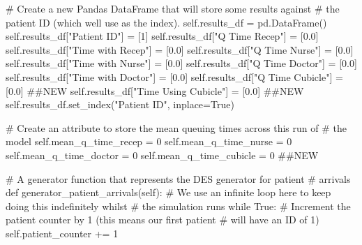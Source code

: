\documentclass[
  letterpaper,
  DIV=11,
  numbers=noendperiod]{scrreprt}
\newenvironment{Shaded}{}{}
\newcommand{\CommentTok}[1]{\textcolor[rgb]{0.42,0.45,0.49}{#1}}
\newcommand{\ControlFlowTok}[1]{\textcolor[rgb]{0.84,0.23,0.29}{#1}}
\newcommand{\DecValTok}[1]{\textcolor[rgb]{0.00,0.36,0.77}{#1}}
\newcommand{\FloatTok}[1]{\textcolor[rgb]{0.00,0.36,0.77}{#1}}
\newcommand{\KeywordTok}[1]{\textcolor[rgb]{0.84,0.23,0.29}{#1}}
\newcommand{\NormalTok}[1]{\textcolor[rgb]{0.14,0.16,0.18}{#1}}
\newcommand{\OperatorTok}[1]{\textcolor[rgb]{0.14,0.16,0.18}{#1}}
\newcommand{\StringTok}[1]{\textcolor[rgb]{0.01,0.18,0.38}{#1}}
\newcommand{\VariableTok}[1]{\textcolor[rgb]{0.89,0.38,0.04}{#1}}
\begin{document}
\begin{tcolorbox}
\begin{Shaded}
\begin{Highlighting}[]
        \CommentTok{\# Create a new Pandas DataFrame that will store some results against}
        \CommentTok{\# the patient ID (which we\textquotesingle{}ll use as the index).}
        \VariableTok{self}\NormalTok{.results\_df }\OperatorTok{=}\NormalTok{ pd.DataFrame()}
        \VariableTok{self}\NormalTok{.results\_df[}\StringTok{"Patient ID"}\NormalTok{] }\OperatorTok{=}\NormalTok{ [}\DecValTok{1}\NormalTok{]}
        \VariableTok{self}\NormalTok{.results\_df[}\StringTok{"Q Time Recep"}\NormalTok{] }\OperatorTok{=}\NormalTok{ [}\FloatTok{0.0}\NormalTok{]}
        \VariableTok{self}\NormalTok{.results\_df[}\StringTok{"Time with Recep"}\NormalTok{] }\OperatorTok{=}\NormalTok{ [}\FloatTok{0.0}\NormalTok{]}
        \VariableTok{self}\NormalTok{.results\_df[}\StringTok{"Q Time Nurse"}\NormalTok{] }\OperatorTok{=}\NormalTok{ [}\FloatTok{0.0}\NormalTok{]}
        \VariableTok{self}\NormalTok{.results\_df[}\StringTok{"Time with Nurse"}\NormalTok{] }\OperatorTok{=}\NormalTok{ [}\FloatTok{0.0}\NormalTok{]}
        \VariableTok{self}\NormalTok{.results\_df[}\StringTok{"Q Time Doctor"}\NormalTok{] }\OperatorTok{=}\NormalTok{ [}\FloatTok{0.0}\NormalTok{]}
        \VariableTok{self}\NormalTok{.results\_df[}\StringTok{"Time with Doctor"}\NormalTok{] }\OperatorTok{=}\NormalTok{ [}\FloatTok{0.0}\NormalTok{]}
        \VariableTok{self}\NormalTok{.results\_df[}\StringTok{"Q Time Cubicle"}\NormalTok{] }\OperatorTok{=}\NormalTok{ [}\FloatTok{0.0}\NormalTok{] }\CommentTok{\#\#NEW}
        \VariableTok{self}\NormalTok{.results\_df[}\StringTok{"Time Using Cubicle"}\NormalTok{] }\OperatorTok{=}\NormalTok{ [}\FloatTok{0.0}\NormalTok{] }\CommentTok{\#\#NEW}
        \VariableTok{self}\NormalTok{.results\_df.set\_index(}\StringTok{"Patient ID"}\NormalTok{, inplace}\OperatorTok{=}\VariableTok{True}\NormalTok{)}

        \CommentTok{\# Create an attribute to store the mean queuing times across this run of}
        \CommentTok{\# the model}
        \VariableTok{self}\NormalTok{.mean\_q\_time\_recep }\OperatorTok{=} \DecValTok{0}
        \VariableTok{self}\NormalTok{.mean\_q\_time\_nurse }\OperatorTok{=} \DecValTok{0}
        \VariableTok{self}\NormalTok{.mean\_q\_time\_doctor }\OperatorTok{=} \DecValTok{0}
        \VariableTok{self}\NormalTok{.mean\_q\_time\_cubicle }\OperatorTok{=} \DecValTok{0} \CommentTok{\#\#NEW}

    \CommentTok{\# A generator function that represents the DES generator for patient}
    \CommentTok{\# arrivals}
    \KeywordTok{def}\NormalTok{ generator\_patient\_arrivals(}\VariableTok{self}\NormalTok{):}
        \CommentTok{\# We use an infinite loop here to keep doing this indefinitely whilst}
        \CommentTok{\# the simulation runs}
        \ControlFlowTok{while} \VariableTok{True}\NormalTok{:}
            \CommentTok{\# Increment the patient counter by 1 (this means our first patient}
            \CommentTok{\# will have an ID of 1)}
            \VariableTok{self}\NormalTok{.patient\_counter }\OperatorTok{+=} \DecValTok{1}


\end{Highlighting}
\end{Shaded}
\end{tcolorbox}
\end{document}
